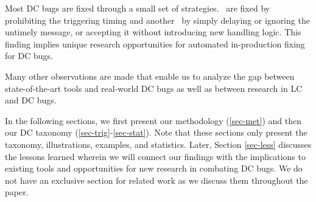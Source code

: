 \vnb Most DC bugs are fixed through a small set of strategies.
\pctFixTime\ are fixed by prohibiting the triggering timing and
another \pctFixHandEasy\ by simply delaying or ignoring the untimely
message, or accepting it without introducing new handling logic.
This finding implies unique research opportunities for automated
in-production fixing for DC bugs.


\vnb Many other observations are made that enable us to analyze the
gap between state-of-the-art tools and real-world DC bugs as well as
between research in LC and DC bugs.



\vfive In the following sections, we first present our methodology
(\sec\ref{sec-met}) and then our DC taxonomy
(\sec\ref{sec-trig}-\sec\ref{sec-stat}).
Note that these sections only present the taxonomy, illustrations,
examples, and statistics.  Later, Section \sec\ref{sec-less} discusses
the lessons learned wherein we will connect our findings with the
implications to existing tools and opportunities for new research in
combating DC bugs.  We do not have an exclusive section for related
work as we discuss them throughout the paper.
